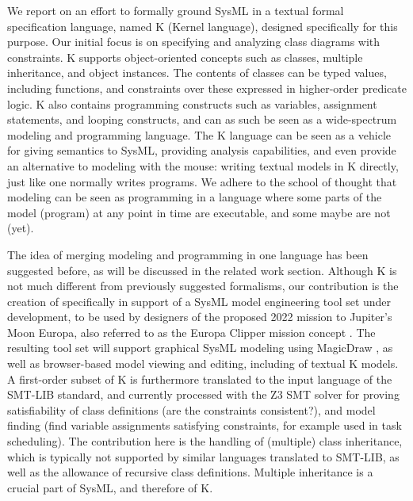 We report on an effort to formally ground SysML in a textual formal
specification language, named K (Kernel language), designed
specifically for this purpose.  Our initial focus is on specifying and
analyzing class diagrams with constraints. K supports object-oriented
concepts such as classes, multiple inheritance, and object
instances. The contents of classes can be typed values, including
functions, and constraints over these expressed in higher-order
predicate logic.  K also contains programming constructs such as
variables, assignment statements, and looping constructs, and can as
such be seen as a wide-spectrum modeling and programming language.
The K language can be seen as a vehicle for giving semantics to SysML,
providing analysis capabilities, and even provide an alternative to
modeling with the mouse: writing textual models in K directly, just
like one normally writes programs.  We adhere to the school of thought
that modeling can be seen as programming in a language where some
parts of the model (program) at any point in time are executable, and
some maybe are not (yet).

The idea of merging modeling and programming in one language has been
suggested before, as will be discussed in the related work section.
Although K is not much different from previously suggested formalisms,  
our contribution is the creation of \Klang{} specifically in support of a
SysML model engineering tool set under development, to be used by
designers of the proposed 2022 mission to Jupiter's Moon Europa, also
referred to as the Europa Clipper mission concept
\cite{europa-clipper}.  The resulting tool set will support graphical
SysML modeling using MagicDraw \cite{magicdraw}, as well as
browser-based model viewing and editing, including of textual K
models. A first-order subset of K is furthermore translated to the input language of the
SMT-LIB standard, and currently processed with the Z3 SMT solver for
proving satisfiability of class definitions (are the constraints
consistent?), and model finding (find variable assignments satisfying
constraints, for example used in task scheduling).  The contribution here is
the handling of (multiple) class inheritance, which is typically not supported
by similar languages translated to SMT-LIB, as well as the allowance
of recursive class definitions. Multiple inheritance is a crucial part
of SysML, and therefore of K.


